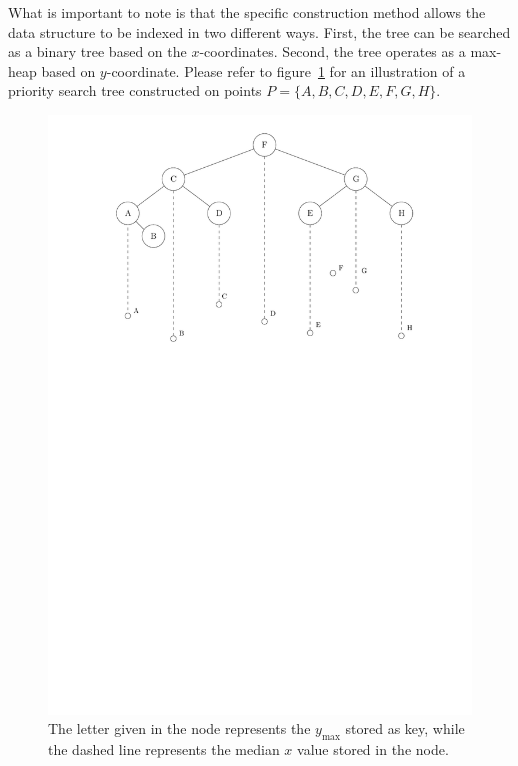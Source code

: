 \documentclass[twoside,11pt,openright]{report}
\begin{document}
What is important to note is that the specific construction method allows the data structure to be indexed in two different ways. First, the tree can be searched as a binary tree based on the $x$-coordinates. Second, the tree operates as a max-heap based on $y$-coordinate. Please refer to figure~\ref{fig:static_pst} for an illustration of a priority search tree constructed on points $P = \{A, B, C, D, E, F, G, H\}$.

\begin{figure}[h]
	\centering
	\includegraphics[scale=0.68]{../figures/internal_pst_static}
	\caption{The letter given in the node represents the $y_{\text{max}}$ stored as key, while the dashed line represents the median $x$ value stored in the node.}
	\label{fig:static_pst}
\end{figure}
\end{document}
